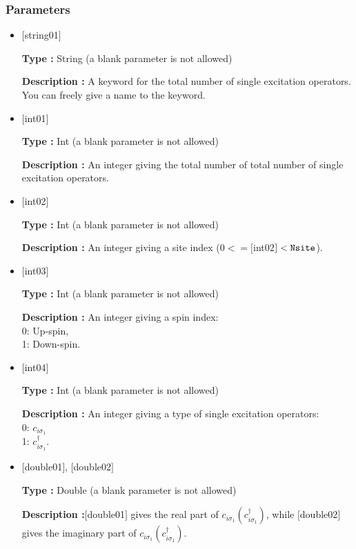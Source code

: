 \subsubsection{Parameters}
 \begin{itemize}

   \item  $[$string01$]$
   
    {\bf Type :} String (a blank parameter is not allowed)

   {\bf Description :} A keyword for the total number of single excitation operators. You can freely give a name to the keyword.

   \item  $[$int01$]$
   
    {\bf Type :} Int (a blank parameter is not allowed)

   {\bf Description :} An integer giving the total number of total number of single excitation operators.

  \item  $[$int02$]$

 {\bf Type :} Int (a blank parameter is not allowed)

 {\bf Description :} An integer giving a site index ($0<= [$int02$]<\verb|Nsite|$).
 
  \item  $[$int03$]$
  
 {\bf Type :} Int (a blank parameter is not allowed)

{\bf Description :} 
An integer giving a spin index:\\
0: Up-spin,\\
1: Down-spin.

\item  $[$int04$]$

 {\bf Type :} Int (a blank parameter is not allowed)

{\bf Description :} 
An integer giving a type of single excitation operators:\\
0: $ c_{i\sigma_1}$\\
1: $ c_{i\sigma_1}^{\dagger}$.\\

\item  $[$double01$]$, $[$double02$]$

 {\bf Type :} Double (a blank parameter is not allowed)

{\bf Description :}$[$double01$]$ gives the real part of $c_{i\sigma_1} (c_{i\sigma_1} ^{\dag})$, while $[$double02$]$ gives the imaginary part of $c_{i\sigma_1} (c_{i\sigma_1} ^{\dag})$.

\end{itemize}

